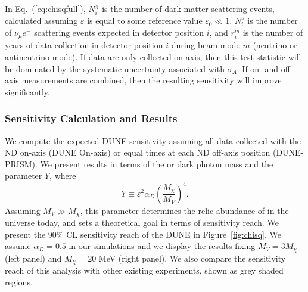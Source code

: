 
In Eq.~(\ref{eq:chisqfull}), $N_i^\chi$ is the number of dark matter scattering events, calculated assuming $\varepsilon$ is equal to some reference value $\varepsilon_0 \ll 1$. $N_i^\nu$ is the number of $\nu_\mu e^-$ scattering events expected in detector position $i$, and $r_i^m$ is the number of years of data collection in detector position $i$ during beam mode $m$ (neutrino or antineutrino mode). If data are only collected on-axis, then this test statistic will be dominated by the systematic uncertainty associated with $\sigma_A$. If on- and off-axis measurements are combined, then the resulting sensitivity will improve significantly.

\subsubsection{Sensitivity Calculation and Results}

We compute the expected DUNE sensitivity assuming all data collected with the ND on-axis (DUNE On-axis) or equal times at each ND off-axis position (DUNE-PRISM). We present results in terms of the  or dark photon mass and the parameter $Y$, where
\begin{equation}
Y \equiv \varepsilon^2 \alpha_D \left(\frac{M_\chi}{M_V}\right)^4.    
\end{equation}
Assuming $M_V \gg M_\chi$, this parameter determines the relic abundance of  in the universe today, and sets a theoretical goal in terms of sensitivity reach. We present the 90\% CL sensitivity reach of the DUNE  in Figure~\ref{fig:chisq}. 
We assume $\alpha_D = 0.5$ in our simulations and we display the results fixing $M_V = 3M_\chi$ (left panel) and $M_\chi = 20$ MeV (right panel).
We also compare the sensitivity reach of this analysis with other existing experiments, shown as grey shaded regions.

